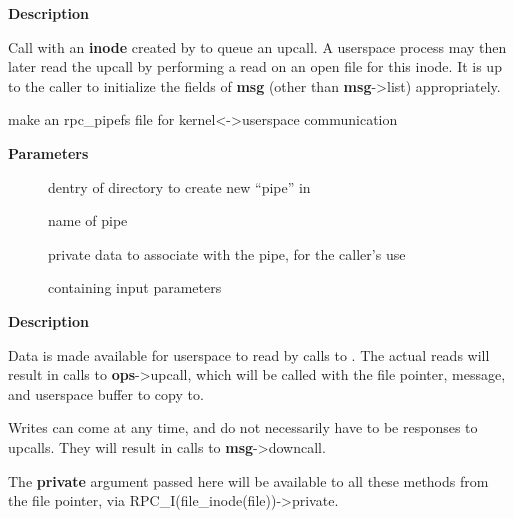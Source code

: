 \documentclass[a4paper,8pt,english]{sphinxmanual}
\begin{document}
\textbf{Description}

Call with an \textbf{inode} created by  to queue an upcall.
A userspace process may then later read the upcall by performing a
read on an open file for this inode.  It is up to the caller to
initialize the fields of \textbf{msg} (other than \textbf{msg}-\textgreater{}list) appropriately.

\begin{fulllineitems}
\label{networking/kapi:c.rpc_mkpipe_dentry}
make an rpc\_pipefs file for kernel\textless{}-\textgreater{}userspace communication

\end{fulllineitems}


\textbf{Parameters}
\begin{description}
\item[{}] \leavevmode
dentry of directory to create new ``pipe'' in

\item[{}] \leavevmode
name of pipe

\item[{}] \leavevmode
private data to associate with the pipe, for the caller's use

\item[{}] \leavevmode
{} containing input parameters

\end{description}

\textbf{Description}

Data is made available for userspace to read by calls to
{\hyperref[networking/kapi:c.rpc_queue_upcall]{\emph{}}}.  The actual reads will result in calls to
\textbf{ops}-\textgreater{}upcall, which will be called with the file pointer,
message, and userspace buffer to copy to.

Writes can come at any time, and do not necessarily have to be
responses to upcalls.  They will result in calls to \textbf{msg}-\textgreater{}downcall.

The \textbf{private} argument passed here will be available to all these methods
from the file pointer, via RPC\_I(file\_inode(file))-\textgreater{}private.
\end{document}
